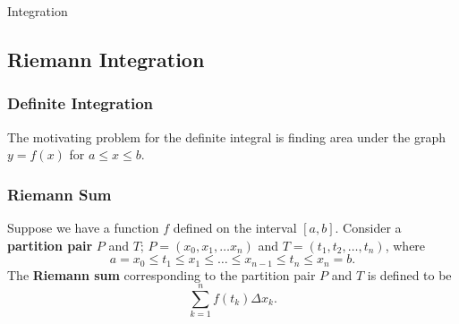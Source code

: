 \documentclass{beamer}
\begin{document}
\begin{frame}
\begin{center}
\Huge Integration
\end{center}
\end{frame}

\subsection{Riemann Integration}

\begin{frame}
\frametitle{Definite Integration}
\begin{center}
\end{center}
The motivating problem for the definite integral is finding area under the graph $y = f(x)$ for $a \leq x \leq b$.
\end{frame}

\begin{frame}
\frametitle{Riemann Sum}
\begin{Definition}
Suppose we have a function $f$ defined on the interval $[a, b]$. Consider a {\bf partition pair} $P$ and $T$; $P = (x_0, x_1, \ldots x_n)$ and $T = (t_1, t_2, \ldots, t_n)$, where
$$
a = x_0 \leq t_1 \leq x_1 \leq \ldots\leq x_{n-1} \leq t_n \leq x_n = b.
$$ 
The {\bf Riemann sum} corresponding to the partition pair $P$ and $T$ is defined to be
$$
\sum_{k = 1}^n f(t_k)\Delta x_k.
$$
\end{Definition}
\end{frame}
\end{document}
